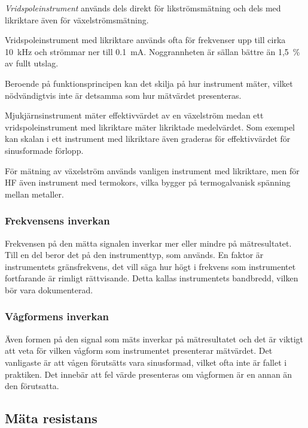 \emph{Vridspoleinstrument} används dels direkt för likströmsmätning
och dels med likriktare även för växelströmsmätning.

Vridspoleinstrument med likriktare används ofta för frekvenser upp till cirka
\SI{10}{\kilo\hertz} och strömmar ner till \SI{0,1}{\milli\ampere}.
Noggrannheten är sällan bättre än 1,5~\% av fullt utslag.

Beroende på funktionsprincipen kan det skilja på hur instrument mäter,
vilket nödvändigtvis inte är detsamma som hur mätvärdet presenteras.

Mjukjärnsinstrument mäter effektivvärdet av en växelström medan ett
vridspoleinstrument med likriktare mäter likriktade medelvärdet.
Som exempel kan skalan i ett instrument med likriktare även graderas för
effektivvärdet för sinusformade förlopp.

För mätning av växelström används vanligen instrument med likriktare,
men för HF även instrument med termokors, vilka bygger på
termogalvanisk spänning mellan metaller.

\subsubsection{Frekvensens inverkan}

Frekvensen på den mätta signalen inverkar mer eller mindre på mätresultatet.
Till en del beror det på den instrumenttyp, som används.
En faktor är instrumentets gränsfrekvens, det vill säga hur högt i frekvens som
instrumentet fortfarande är rimligt rättvisande.
Detta kallas instrumentets bandbredd, vilken bör vara dokumenterad.

\subsubsection{Vågformens inverkan}

Även formen på den signal som mäts inverkar på mätresultatet och det
är viktigt att veta för vilken vågform som instrumentet presenterar mätvärdet.
Det vanligaste är att vågen förutsätts vara sinusformad, vilket ofta inte är
fallet i praktiken.
Det innebär att fel värde presenteras om vågformen är en annan än den
förutsatta.

\subsection{Mäta resistans}

